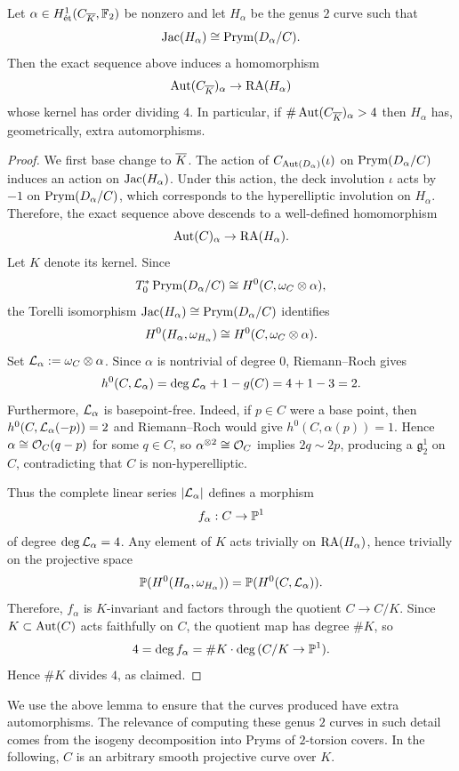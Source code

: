 \documentclass[main.tex]{subfiles}
\begin{document}
\begin{lemma} \label{lem:stabilizer_prym_kernel}
Let $\alpha \in H^1_{\et}(C_{\ol{K}}, \FF_2)$ be nonzero and let $H_{\alpha}$ be the genus $2$ curve such that
\[ \Jac(H_{\alpha}) \cong \Prym(D_{\alpha}/C). \]
Then the exact sequence above induces a homomorphism
\[ \Aut(C_{\ol{K}})_{\alpha} \to \RA(H_{\alpha}) \]
whose kernel has order dividing $4$. In particular, if $\# \Aut(C_{\ol{K}})_{\alpha} > 4$ then $H_{\alpha}$ has, geometrically, extra automorphisms.
\end{lemma}

\begin{proof}
We first base change to $\ol{K}$. The action of $C_{\Aut(D_{\alpha})}(\iota)$ on $\Prym(D_{\alpha}/C)$ induces an action on $\Jac(H_{\alpha})$. Under this action, the deck involution $\iota$ acts by $-1$ on $\Prym(D_{\alpha}/C)$, which corresponds to the hyperelliptic involution on $H_{\alpha}$. Therefore, the exact sequence above descends to a well-defined homomorphism
\[ \Aut(C)_{\alpha} \to \RA(H_{\alpha}). \]
Let $K$ denote its kernel. Since
\[ T_0^* \Prym(D_{\alpha}/C) \cong H^0(C, \omega_C \ot \alpha), \]
the Torelli isomorphism $\Jac(H_{\alpha}) \cong \Prym(D_{\alpha}/C)$ identifies
\[ H^0(H_{\alpha}, \omega_{H_{\alpha}}) \cong H^0(C, \omega_C \ot \alpha). \]
Set $\L_{\alpha} := \omega_C \ot \alpha$. Since $\alpha$ is nontrivial of degree $0$, Riemann--Roch gives
\[ h^0(C, \L_{\alpha}) = \deg{\L_{\alpha}} + 1 - g(C) = 4 + 1 - 3 = 2. \]
Furthermore, $\L_{\alpha}$ is basepoint-free. Indeed, if $p \in C$ were a base point, then $h^0(C, \L_{\alpha}(-p)) = 2$ and Riemann--Roch would give $h^0(C, \alpha(p)) = 1$. Hence $\alpha \cong \cO_C(q-p)$ for some $q \in C$, so $\alpha^{\ot 2} \cong \cO_C$ implies $2q \sim 2p$, producing a $\mathfrak{g}^1_2$ on $C$, contradicting that $C$ is non-hyperelliptic.
\par
Thus the complete linear series $|\L_{\alpha}|$ defines a morphism
\[ f_{\alpha} : C \to \P^1 \]
of degree $\deg{\L_{\alpha}} = 4$. Any element of $K$ acts trivially on $\RA(H_{\alpha})$, hence trivially on the projective space
\[ \P(H^0(H_{\alpha}, \omega_{H_{\alpha}})) = \P(H^0(C, \L_{\alpha})). \]
Therefore, $f_{\alpha}$ is $K$-invariant and factors through the quotient $C \to C/K$. Since $K \subset \Aut(C)$ acts faithfully on $C$, the quotient map has degree $\# K$, so
\[ 4 = \deg{f_{\alpha}} = \# K \cdot \deg{(C/K \to \P^1)}. \]
Hence $\# K$ divides $4$, as claimed.
\end{proof}


We use the above lemma to ensure that the curves produced have extra automorphisms. The relevance of computing these genus $2$ curves in such detail comes from the isogeny decomposition into Pryms of \etale $2$-torsion covers. In the following, $C$ is an arbitrary smooth projective curve over $K$.
\end{document}
